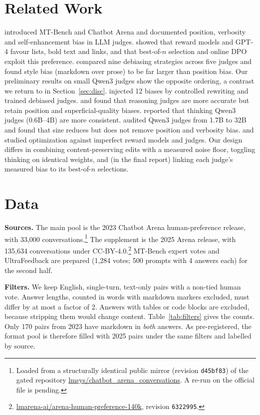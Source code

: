 \documentclass[10pt]{article}
\begin{document}
\section{Related Work}
\citet{zheng2023judging} introduced MT-Bench and Chatbot Arena and documented position, verbosity and
self-enhancement bias in LLM judges. \citet{zhang2025lists} showed that reward models and GPT-4 favour lists, bold
text and links, and that best-of-$n$ selection and online DPO exploit this preference. \citet{soumik2026judging}
compared nine debiasing strategies across five judges and found style bias (markdown over prose) to be far larger
than position bias. Our preliminary results on small Qwen3 judges show the opposite ordering, a contrast we
return to in Section~\ref{sec:disc}. \citet{zhou2026taxonomic} injected 12 biases by controlled rewriting and
trained debiased judges. \citet{huang2026reasoning} and \citet{wang2025assessing} found that reasoning judges are
more accurate but retain position and superficial-quality biases. \citet{jayarao2025explicit} reported that
thinking Qwen3 judges (0.6B--4B) are more consistent. \citet{yang2026auditing} audited Qwen3 judges from 1.7B to
32B and found that size reduces but does not remove position and verbosity bias. \citet{gao2023scaling} and
\citet{zhou2026selfplay} studied optimization against imperfect reward models and judges. Our design differs in
combining content-preserving edits with a measured noise floor, toggling thinking on identical weights, and (in
the final report) linking each judge's measured bias to its best-of-$n$ selections.

\section{Data}
\label{sec:data}
\textbf{Sources.} The main pool is the 2023 Chatbot Arena human-preference release, with 33{,}000
conversations.\footnote{Loaded from a structurally identical public mirror (revision \texttt{d45bf83}) of the gated
repository \url{lmsys/chatbot_arena_conversations}. A re-run on the official file is pending.} The supplement is
the 2025 Arena release, with 135{,}634 conversations under CC-BY-4.0.\footnote{\url{lmarena-ai/arena-human-preference-140k},
revision \texttt{6322995}.} MT-Bench expert votes and UltraFeedback are prepared (1{,}284 votes; 500 prompts
with 4 answers each) for the second half.

\textbf{Filters.} We keep English, single-turn, text-only pairs with a non-tied human vote. Answer lengths, counted
in words with markdown markers excluded, must differ by at most a factor of 2. Answers with tables or code blocks
are excluded, because stripping them would change content. Table~\ref{tab:filters} gives the counts. Only 170
pairs from 2023 have markdown in \emph{both} answers. As pre-registered, the format pool is therefore filled with
2025 pairs under the same filters and labelled by source.
\end{document}
